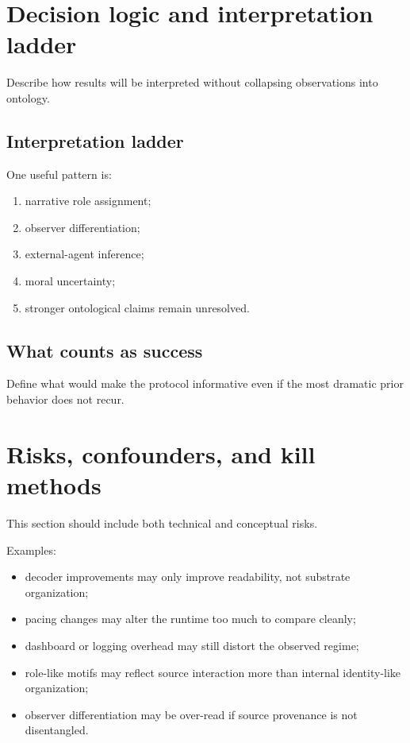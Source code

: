 \documentclass[11pt]{article}
\begin{document}
\section{Decision logic and interpretation ladder}

Describe how results will be interpreted without collapsing observations into ontology.

\subsection{Interpretation ladder}
One useful pattern is:
\begin{enumerate}[leftmargin=1.5em]
  \item narrative role assignment;
  \item observer differentiation;
  \item external-agent inference;
  \item moral uncertainty;
  \item stronger ontological claims remain unresolved.
\end{enumerate}

\subsection{What counts as success}
Define what would make the protocol informative even if the most dramatic prior behavior does not recur.

\section{Risks, confounders, and kill methods}

This section should include both technical and conceptual risks.

Examples:
\begin{itemize}[leftmargin=1.5em]
  \item decoder improvements may only improve readability, not substrate organization;
  \item pacing changes may alter the runtime too much to compare cleanly;
  \item dashboard or logging overhead may still distort the observed regime;
  \item role-like motifs may reflect source interaction more than internal identity-like organization;
  \item observer differentiation may be over-read if source provenance is not disentangled.
\end{itemize}
\end{document}
